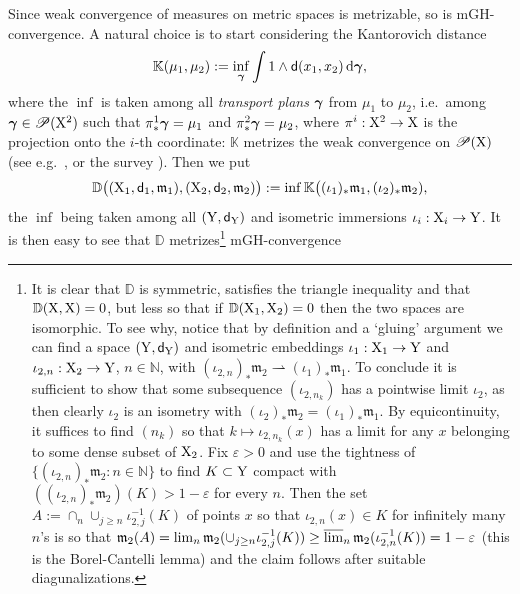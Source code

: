 \documentclass[11pt]{article}
\numberwithin{equation}{section}
\newcommand{\N}{\mathbb{N}}
\newcommand{\ggamma}{{\mbox{\boldmath$\gamma$}}}
\newcommand{\sggamma}{{\mbox{\scriptsize\boldmath$\gamma$}}}
\newcommand{\pr}{\mathscr P}
\newcommand{\X}{{\rm X}}
\newcommand{\Y}{{\rm Y}}
\newcommand{\sfd}{{\sf d}}
\newcommand{\mm}{{\mathfrak m}}
\renewcommand{\d}{{\rm d}}
\newcommand{\lims}{\varlimsup}
\newcommand{\weakto}{\rightharpoonup}
\newcommand{\eps}{\varepsilon}
\begin{document}
Since weak convergence of measures on metric spaces is metrizable, so is mGH-convergence. A natural choice is to start considering the Kantorovich distance 
\[
\mathbb K(\mu_1,\mu_2):=\inf_{\sggamma}\int 1\wedge\sfd(x_1,x_2)\,\d\ggamma,
\]
where the $\inf$ is taken among all \emph{transport plans} $\ggamma$ from $\mu_1$ to $\mu_2$, i.e.\ among $\ggamma\in\pr(\X^2)$ such that $\pi^1_*\ggamma=\mu_1$ and $\pi^2_*\ggamma=\mu_2$, where $\pi^i:\X^2\to\X $ is the projection onto the $i$-th coordinate: $\mathbb K$ metrizes the weak convergence on $\pr(\X)$ (see e.g.\ \cite{AmbrosioGigliSavare08}, \cite{Villani09} or the survey \cite{G11}). Then we put
\begin{equation}
\label{eq:dtheo}
\mathbb D\big((\X_1,\sfd_1,\mm_1),(\X_2,\sfd_2,\mm_2)\big):=\inf \mathbb K\big((\iota_1)_*\mm_1,(\iota_2)_*\mm_2),
\end{equation}
the $\inf$ being taken among all $(\Y,\sfd_\Y)$ and isometric immersions $\iota_i:\X_i\to\Y$.  It is then easy to see that $\mathbb D$ metrizes\footnote{It is clear  that $\mathbb D$ is symmetric, satisfies the triangle inequality and that $\mathbb D(\X,\X)=0$, but less so that  if $\mathbb D(\X_1,\X_2)=0$ then the two spaces are isomorphic. To see why, notice that by definition and  a `gluing' argument we can find a space $(\Y,\sfd_\Y)$ and isometric embeddings $\iota_1:\X_1\to\Y$ and $\iota_{2,n}:\X_2\to\Y$, $n\in\N$, with $(\iota_{2,n})_*\mm_2\weakto(\iota_1)_*\mm_1$.  To conclude it is sufficient to show that some subsequence $(\iota_{2,n_k})$ has a pointwise limit $\iota_2$, as then clearly $\iota_2$ is an isometry with $(\iota_2)_*\mm_2=(\iota_1)_*\mm_1$.  By equicontinuity, it suffices to find $(n_k)$ so that $k\mapsto \iota_{2,n_k}(x)$ has a limit for any $x$ belonging to some dense subset of $\X_2$. Fix $\eps>0$ and  use the tightness of $\{(\iota_{2,n})_*\mm_2:n\in\N\}$ to find $K\subset\Y$ compact with $((\iota_{2,n})_*\mm_2)(K)>1-\eps$ for every $n$. Then the set $A:=\cap_n\cup_{j\geq n}\iota_{2,j}^{-1}(K)$ of points $x$ so that $\iota_{2,n}(x)\in K$ for infinitely many $n$'s is so that $\mm_2(A)=\lim_n\mm_2(\cup_{j\geq n}\iota_{2,j}^{-1}(K))\geq \lims_n \mm_2(\iota_{2,n}^{-1}(K))=1-\eps$ (this is the Borel-Cantelli lemma) and the claim follows after suitable diagunalizations.}  mGH-convergence
\end{document}
